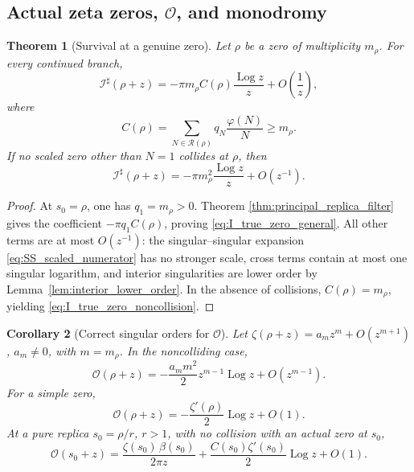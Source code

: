 \documentclass[11pt]{amsart}
\numberwithin{equation}{section}
\theoremstyle{plain}
\newtheorem{theorem}{Theorem}[section]
\newtheorem{corollary}[theorem]{Corollary}
\theoremstyle{definition}
\theoremstyle{remark}
\newcommand{\Log}{\operatorname{Log}}
\begin{document}
\subsection{Actual zeta zeros, \(\mathcal O\), and monodromy}
\label{subsec:O_vs_I_singularities}

\begin{theorem}[Survival at a genuine zero]
\label{thm:r1_survival}
Let \(\rho\) be a zero of multiplicity \(m_\rho\).  For every continued
branch,
\begin{equation}
\mathcal I^\sharp(\rho+z)
=
-\pi m_\rho C(\rho)\frac{\Log z}{z}
+O\!\left(\frac1z\right),
\label{eq:I_true_zero_general}
\end{equation}
where
\begin{equation}
C(\rho)
=
\sum_{N\in\mathcal R(\rho)}q_N\frac{\varphi(N)}N
\ge m_\rho.
\label{eq:C_rho_true_zero}
\end{equation}
If no scaled zero other than \(N=1\) collides at \(\rho\), then
\begin{equation}
\boxed{
\mathcal I^\sharp(\rho+z)
=-\pi m_\rho^2\frac{\Log z}{z}+O(z^{-1}).}
\label{eq:I_true_zero_noncollision}
\end{equation}
\end{theorem}

\begin{proof}
At \(s_0=\rho\), one has \(q_1=m_\rho>0\).  Theorem
\ref{thm:principal_replica_filter} gives the coefficient
\(-\pi q_1C(\rho)\), proving \eqref{eq:I_true_zero_general}.  All other
terms are at most \(O(z^{-1})\): the singular--singular expansion
\eqref{eq:SS_scaled_numerator} has no stronger scale, cross terms contain at
most one singular logarithm, and interior singularities are lower order by
Lemma~\ref{lem:interior_lower_order}.  In the absence of collisions,
\(C(\rho)=m_\rho\), yielding \eqref{eq:I_true_zero_noncollision}.
\end{proof}

\begin{corollary}[Correct singular orders for \(\mathcal O\)]
\label{cor:O_correct_singular_orders}
Let \(\zeta(\rho+z)=a_mz^m+O(z^{m+1})\), \(a_m\ne0\), with
\(m=m_\rho\).  In the noncolliding case,
\begin{equation}
\boxed{
\mathcal O(\rho+z)
=-\frac{a_m m^2}{2}z^{m-1}\Log z+O(z^{m-1}).}
\label{eq:O_true_zero_order}
\end{equation}
For a simple zero,
\begin{equation}
\boxed{
\mathcal O(\rho+z)
=-\frac{\zeta'(\rho)}2\Log z+O(1).}
\label{eq:O_simple_zero_log}
\end{equation}
At a pure replica \(s_0=\rho/r\), \(r>1\), with no collision with an
actual zero at \(s_0\),
\begin{equation}
\boxed{
\mathcal O(s_0+z)
=
\frac{\zeta(s_0)\,\beta(s_0)}{2\pi z}
+
\frac{C(s_0)\zeta'(s_0)}2\Log z
+O(1).}
\label{eq:O_pure_replica_expansion}
\end{equation}
\end{corollary}
\end{document}

